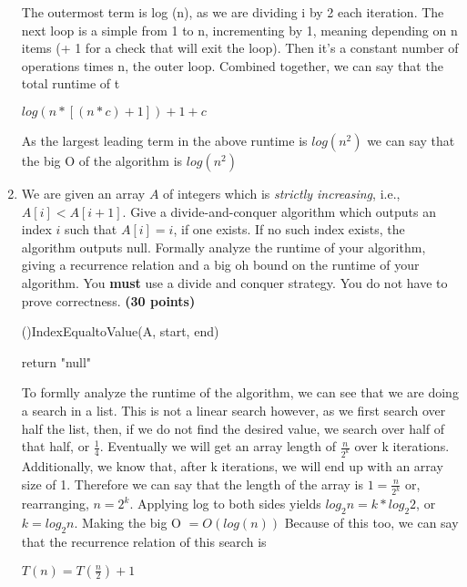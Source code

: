 \documentclass[11pt]{amsart}
\DeclarePairedDelimiter\floor{\lfloor}{\rfloor}
\begin{document}
\begin{enumerate}
\bigskip
The outermost term is log (n), as we are dividing i by 2 each iteration. The next loop is a simple from 1 to n, incrementing by 1, meaning depending on n items (+ 1 for a check that will exit the loop). Then it's a constant number of operations times n, the outer loop. Combined together, we can say that the total runtime of t\\
\begin{center}
	$log(n * [(n * c) + 1]) + 1 + c$
\end{center}
As the largest leading term in the above runtime is $log(n^2)$ we can say that the big O of the algorithm is $log(n^2)$

\newpage

\item We are given an array $A$ of integers which is \textit{strictly increasing}, i.e., $A[i] < A[i+1]$. Give a divide-and-conquer algorithm which outputs an index $i$ such that $A[i] = i$, if one exists. If no such index exists, the algorithm outputs null. Formally analyze the runtime of your algorithm, giving a recurrence relation and a big oh bound on the runtime of your algorithm. You \textbf{must} use a divide and conquer strategy. You do not have to prove correctness. \textbf{(30 points)}
\begin{algorithm}[H]
	\Fn(){IndexEqualtoValue(A, start, end)}{
	\SetAlgoLined
	\SetNoFillComment
	\DontPrintSemicolon
		
		return "null"
	}
\end{algorithm}
\bigskip
To formlly analyze the runtime of the algorithm, we can see that we are doing a search in a list. This is not a linear search however, as we first search over half the list, then, if we do not find the desired value, we search over half of that half, or $\frac{1}{4}$. Eventually we will get an array length of $\frac{n}{2^k}$ over k iterations. Additionally, we know that, after k iterations, we will end up with an array size of 1. Therefore we can say that the length of the array is $1 = \frac{n}{2^k}$ or, rearranging, $n = 2^k$. Applying log to both sides yields $log_2{n} = k * log_2{2}$, or $k = log_2{n}$. Making the big O $= O(log(n))$ Because of this too, we can say that the recurrence relation of this search is\\
\begin{center}
	$T(n) = T(\frac{n}{2}) + 1$
\end{center}
\newpage


\end{enumerate}
\end{document}
